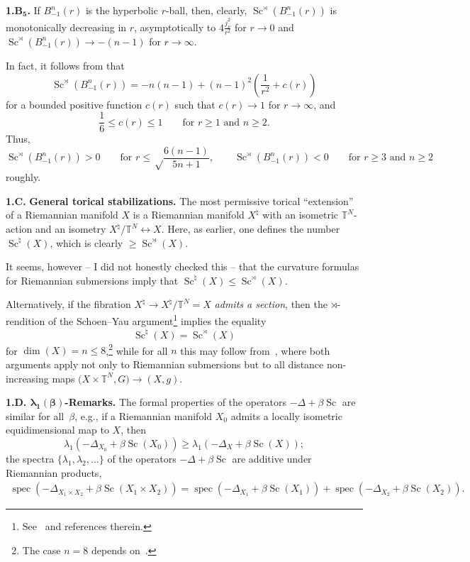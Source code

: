 \documentclass[pdftex]{sigma}
\numberwithin{equation}{section}
\begin{document}
 \textbf{1.B$\boldsymbol{{}_5}$.} If $ B_{-1}^n(r)$ is the hyperbolic $r$-ball,
 then, clearly, $ \operatorname{Sc}^\rtimes (B_{-1}^n(r))$ is monotonically decreasing in $r$, asymptotically to
 $4\frac {j_{\nu}^2}{r^2}$ for $r\to 0$ and $ \operatorname{Sc}^\rtimes (B_{-1}^n(r))\to -(n-1)$ for $r\to \infty$.

 In fact, it follows from \cite[Theorem~3.3]{BF2017} that
\[
\operatorname{Sc}^\rtimes (B_{-1}^n(r))=-n(n-1)+(n-1)^2\left (\frac {1}{r^2} +c(r)\right )
\]
 for a bounded positive function $c(r)$ such that $c(r)\to 1$ for $r\to \infty$, and
\[
 \frac {1}{6}\leq c(r)\leq 1 \qquad \text{for $r\geq 1$ and $n\geq 2$}.
 \]
 Thus,
\[
\operatorname{Sc}^\rtimes (B_{-1}^n(r))>0 \qquad \text{for
 $r\leq \sqrt \frac{6(n-1)}{5n+1}$}, \qquad   \operatorname{Sc}^\rtimes (B_{-1}^n(r))<0 \qquad \text{for $r\geq 3$ and $n\geq 2$}
 \]
roughly.

\textbf{1.C.} \textbf{General torical stabilizations.} The most permissive torical ``extension'' of a Riemannian manifold $X$ is a Riemannian
 manifold $X^\natural $ with an isometric $\mathbb T^N$-action and an isometry $X^\natural/\mathbb T^N\leftrightarrow X$. Here,
 as earlier, one defines the number $\operatorname{Sc}^\natural(X)$, which is clearly $ \geq \operatorname{Sc}^\rtimes(X)$.

It seems, however -- I did not honestly checked this -- that the curvature formulas for Riemannian submersions \cite{O'N1966} imply that $\operatorname{Sc}^\natural(X)\leq \operatorname{Sc}^\rtimes(X)$.

 Alternatively, if
 the fibration $X^\natural \to X^\natural/\mathbb T^N=X$ {\it admits a section}, then the $\rtimes$-rendition of the Schoen--Yau argument\footnote{See~\cite{Gr2023} and references therein.} implies
the equality
\[
\operatorname{Sc}^\natural(X)= \operatorname{Sc}^\rtimes(X)
\]
for $\dim(X)=n\leq 8$,\footnote {The case $n=8$ depends on~\cite{Sm2003}.} while for all $n$
this may follow from~\cite{WXY2021}, where both arguments apply not only to Riemannian submersions but to all distance non-increasing maps $\bigl(X\times \mathbb T^N, G\bigr)\to (X,g)$.

\textbf{1.D. $\boldsymbol{\lambda_1(\beta)}$-Remarks.} The formal properties of the operators $-\Delta+ \beta \operatorname{Sc}$ are similar for all~$\beta$, e.g.,
if a Riemannian manifold $X_0$ admits a locally isometric equidimensional map to $X$, then
\[
\lambda_1(-\Delta_{X_0}+\beta \operatorname{Sc}(X_0)) \geq \lambda_1(-\Delta_{X}+\beta \operatorname{Sc}(X));
\]
the spectra $ \{\lambda_1,\lambda_2,\dots\}$ of the operators $-\Delta+ \beta \operatorname{Sc}$ are additive under Riemannian products,
\begin{gather*}
\operatorname{spec}(-\Delta_{X_1\times X_2} + \beta \operatorname{Sc}(X_1\times X_2))=\operatorname{spec}(-\Delta_{X_1} + \beta \operatorname{Sc}(X_1))+ \operatorname{spec}(-\Delta_{ X_2} + \beta \operatorname{Sc}( X_2)).
\end{gather*}
\end{document}
